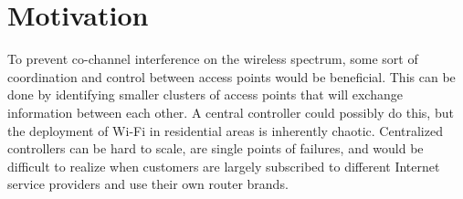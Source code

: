


%
\section{Motivation}
To prevent co-channel interference on the wireless spectrum, some sort of coordination and control between access points would be beneficial. This can be done by identifying
smaller clusters of access points that will exchange information between each other. A central controller could possibly do this, but the deployment of Wi-Fi in residential areas is inherently chaotic. Centralized controllers can be hard to scale, are single points of failures, and would be difficult to realize when customers are largely subscribed to different Internet service providers
and use their own router brands.

